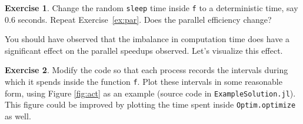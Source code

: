 \documentclass[12pt]{article}
\theoremstyle{definition}
\newtheorem{ex}{Exercise}
\begin{document}
\begin{ex}
Change the random \texttt{sleep} time inside \texttt{f} to a deterministic time, say 0.6 seconds. Repeat Exercise~\ref{ex:par}. Does the parallel efficiency change?
\end{ex}

You should have observed that the imbalance in computation time does have a significant effect on the parallel speedups observed. Let's visualize this effect. 

\begin{ex}
Modify the code so that each process records the intervals during which it spends inside the function \texttt{f}. Plot these intervals in some reasonable form, using Figure \ref{fig:act} as an example (source code in \texttt{ExampleSolution.jl}). This figure could be improved by plotting the time spent inside \texttt{Optim.optimize} as well. 
\end{ex}
\end{document}
